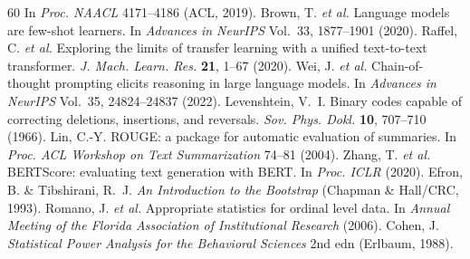 \documentclass[sn-nature]{sn-jnl}
\begin{document}
\begin{thebibliography}{60}
In \emph{Proc. NAACL} 4171--4186 (ACL, 2019).
Brown, T. \emph{et al.}
Language models are few-shot learners.
In \emph{Advances in NeurIPS} Vol.~33, 1877--1901 (2020).
Raffel, C. \emph{et al.}
Exploring the limits of transfer learning with a unified text-to-text transformer.
\emph{J. Mach. Learn. Res.} \textbf{21}, 1--67 (2020).
Wei, J. \emph{et al.}
Chain-of-thought prompting elicits reasoning in large language models.
In \emph{Advances in NeurIPS} Vol.~35, 24824--24837 (2022).
Levenshtein, V.~I.
Binary codes capable of correcting deletions, insertions, and reversals.
\emph{Sov. Phys. Dokl.} \textbf{10}, 707--710 (1966).
Lin, C.-Y.
ROUGE: a package for automatic evaluation of summaries.
In \emph{Proc. ACL Workshop on Text Summarization} 74--81 (2004).
Zhang, T. \emph{et al.}
BERTScore: evaluating text generation with BERT.
In \emph{Proc. ICLR} (2020).
Efron, B. \& Tibshirani, R.~J.
\emph{An Introduction to the Bootstrap} (Chapman \& Hall/CRC, 1993).
Romano, J. \emph{et al.}
Appropriate statistics for ordinal level data.
In \emph{Annual Meeting of the Florida Association of Institutional Research} (2006).
Cohen, J.
\emph{Statistical Power Analysis for the Behavioral Sciences} 2nd edn (Erlbaum, 1988).

\end{thebibliography}
\end{document}
